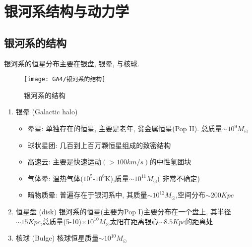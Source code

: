 \newpage
\section{银河系结构与动力学}

\subsection{银河系的结构}

银河系的恒星分布主要在银盘, 银晕, 与核球. 
\begin{figure}[!htb]
    \centering
    \texttt{[image: GA4/银河系的结构]}
    \caption{银河系的结构}
\end{figure}

\begin{enumerate}
    \item 银晕 (Galactic halo)
    \begin{itemize}\small
        \item 晕星: 单独存在的恒星, 主要是老年, 贫金属恒星(Pop II). 总质量$\sim 10^9 M_{\odot}$
        \item 球状星团: 几百到上百万颗恒星组成的致密结构
        \item 高速云: 主要是快速运动$(>100 km/s)$的中性氢团块
        \item 气体晕: 温热气体($10^5$-$10^6$K),质量$\sim 10^{11}M_{\odot}$( 非常不确定)
        \item 暗物质晕: 普遍存在于银河系中, 其质量$\sim 10^{12}M_{\odot}$,空间分布$\sim 200 Kpc$
    \end{itemize}
    \item 恒星盘 (disk)
    \small \subitem 银河系的恒星(主要为Pop I)主要分布在一个盘上, 其半径$\sim 15 Kpc$,总质量(5-10)$\times 10^{10} M_{\odot}$太阳在距离银心$\sim 8.5Kpc$的距离处
    \item \normalsize 核球 (Bulge)
    \small \subitem 核球恒星质量$\sim 10^{10} M_{\odot}$
\end{enumerate}


